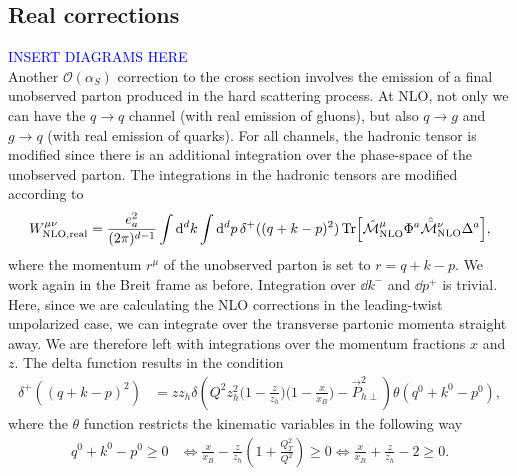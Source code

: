 \subsection{Real corrections}
\textcolor{blue}{INSERT DIAGRAMS HERE}\\
Another $\mathcal{O}(\alpha_S)$ correction to the cross section involves the emission of a final unobserved parton produced in the hard scattering process. At NLO, not only we can have the $q \to q$ channel (with real emission of gluons), but also $q \to g$ and $g \to q$ (with real emission of quarks). For all channels, the hadronic tensor is modified since there is an additional integration over the phase-space of the unobserved parton. The integrations in the hadronic tensors are modified according to
\begin{equation}
\begin{aligned}W^{\mu\nu}_{\rm NLO, real}=\frac{e_a^2}{(2\pi)^{d-1}} \int \dd^dk\int \dd^dp\,\delta^+((q+k-p)^2)\Tr[\hat{\mathcal{M}}^\mu_{\rm NLO}\Phi^a \hat{\bar{\mathcal{M}}}^\nu_{\rm NLO}\Delta^a],
\end{aligned}
\end{equation}
where the momentum $r^\mu$ of the unobserved parton is set to $r=q+k-p$. We work again in the Breit frame as before. Integration over $\dd k^-$ and $\dd p^+$ is trivial. Here, since we are calculating the NLO corrections in the leading-twist unpolarized case, we can integrate over the transverse partonic momenta straight away. We are therefore left with integrations over the momentum fractions $x$ and $z$. The delta function results in the condition \cite{koike_transverse_2022} 
\begin{equation}
\begin{aligned}
     \delta^+((q+k-p)^2)&=z z_h\delta\left(Q^2z_h^2\Big(1-\frac{z}{z_h} \Big)\Big(1-\frac{x}{x_B}\Big) - \vec P_{h\perp}^2\right)\theta(q^0+k^0-p^0),
\end{aligned}
\end{equation}
where the $\theta$ function restricts the kinematic variables in the following way
\begin{equation}\label{eq:NLOrealtw2_theta function condition}
    \begin{aligned}
        q^0+k^0-p^0\ge 0 & \iff \frac{x}{x_B}-\frac{z}{z_h}\left(1+\frac{Q_T^2}{Q^2}\right)\ge 0\iff \frac{x}{x_B}+\frac{z}{z_h}-2\ge 0.
    \end{aligned}
\end{equation}
